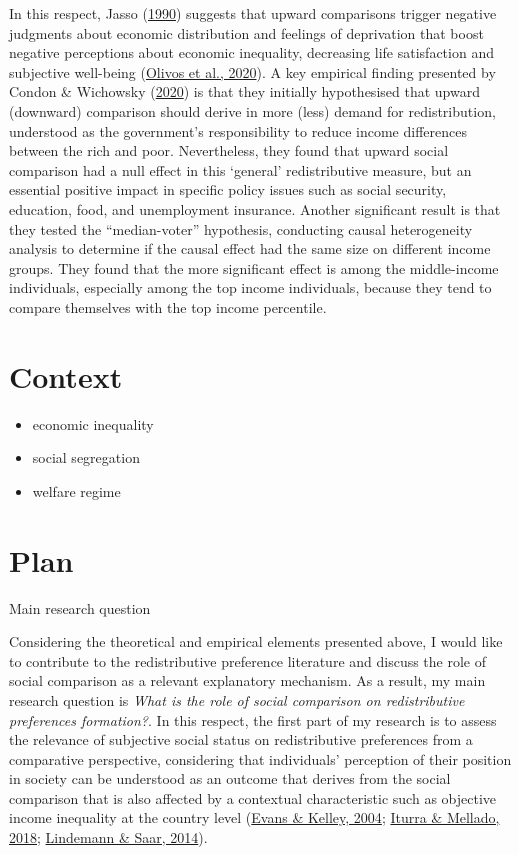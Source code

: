 \documentclass[
  12pt,
]{book}
\begin{document}
In this respect, Jasso (\protect\hyperlink{ref-Jasso1990}{1990}) suggests that upward comparisons trigger negative judgments about economic distribution and feelings of deprivation that boost negative perceptions about economic inequality, decreasing life satisfaction and subjective well-being (\protect\hyperlink{ref-Olivos-etal2020}{Olivos et al., 2020}). A key empirical finding presented by Condon \& Wichowsky (\protect\hyperlink{ref-Condon2020}{2020}) is that they initially hypothesised that upward (downward) comparison should derive in more (less) demand for redistribution, understood as the government's responsibility to reduce income differences between the rich and poor. Nevertheless, they found that upward social comparison had a null effect in this `general' redistributive measure, but an essential positive impact in specific policy issues such as social security, education, food, and unemployment insurance. Another significant result is that they tested the ``median-voter'' hypothesis, conducting causal heterogeneity analysis to determine if the causal effect had the same size on different income groups. They found that the more significant effect is among the middle-income individuals, especially among the top income individuals, because they tend to compare themselves with the top income percentile.

\hypertarget{context}{%
\chapter{Context}\label{context}}

\begin{itemize}
\item
  economic inequality
\item
  social segregation
\item
  welfare regime
\end{itemize}

\hypertarget{plan}{%
\chapter{Plan}\label{plan}}

Main research question

Considering the theoretical and empirical elements presented above, I would like to contribute to the redistributive preference literature and discuss the role of social comparison as a relevant explanatory mechanism. As a result, my main research question is \emph{What is the role of social comparison on redistributive preferences formation?}. In this respect, the first part of my research is to assess the relevance of subjective social status on redistributive preferences from a comparative perspective, considering that individuals' perception of their position in society can be understood as an outcome that derives from the social comparison that is also affected by a contextual characteristic such as objective income inequality at the country level (\protect\hyperlink{ref-Evans2004}{Evans \& Kelley, 2004}; \protect\hyperlink{ref-IturraMellado2019}{Iturra \& Mellado, 2018}; \protect\hyperlink{ref-Lindemann2014}{Lindemann \& Saar, 2014}).
\end{document}
